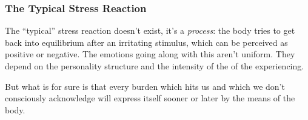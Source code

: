 \documentclass[../Book.Stress_regulation.tex]{subfiles}
\begin{document}
\subsubsection{The Typical Stress Reaction}
The ``typical'' stress reaction doesn't exist, it's a \emph{process}: the body tries to get back into {equilibrium} after an irritating stimulus, which can be perceived as positive or negative.
The emotions going along with this aren't uniform.
They depend on the {personality structure} and the {intensity} of the of the experiencing.

But what is for sure is that every burden which hits us and which we don't {consciously acknowledge} will express itself sooner or later by the means of the body.
\end{document}
